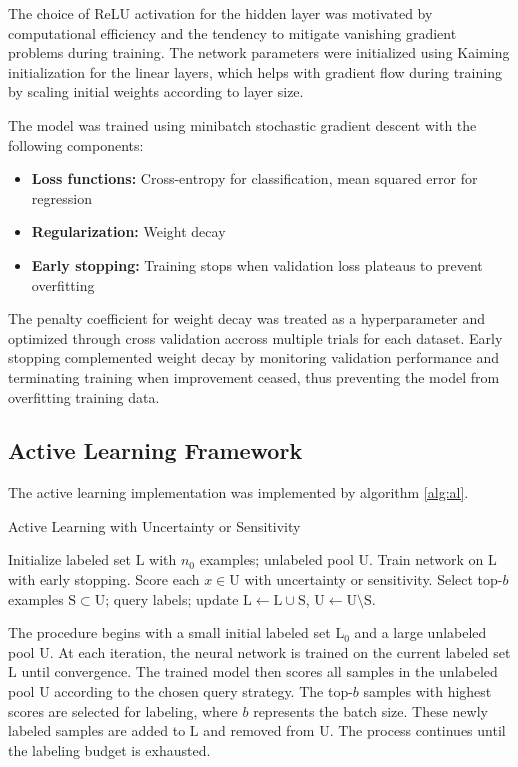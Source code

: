 \documentclass[conference]{IEEEtran}
\newcommand{\set}[1]{\mathrm{#1}}  %
\begin{document}
The choice of ReLU activation for the hidden layer was motivated by computational efficiency and the tendency to mitigate vanishing gradient problems during training. The network parameters were initialized using Kaiming initialization for the linear layers, which helps with gradient flow during training by scaling initial weights according to layer size.

The model was trained using minibatch stochastic gradient descent with the following components:

\begin{itemize}
\item \textbf{Loss functions:} Cross-entropy for classification, mean squared error for regression
\item \textbf{Regularization:} Weight decay
\item \textbf{Early stopping:} Training stops when validation loss plateaus to prevent overfitting
\end{itemize}

The penalty coefficient for weight decay was treated as a hyperparameter and optimized through cross validation accross multiple trials for each dataset. Early stopping complemented weight decay by monitoring validation performance and terminating training when improvement ceased, thus preventing the model from overfitting training data.

\subsection{Active Learning Framework}

The active learning implementation was implemented by algorithm \ref{alg:al}.

\begin{algorithm}[t]
\caption{Active Learning with Uncertainty or Sensitivity}
\label{alg:al}
\begin{algorithmic}[1]
\State Initialize labeled set $\set{L}$ with $n_0$ examples; unlabeled pool $\set{U}$.
  \State Train network on $\set{L}$ with early stopping.
  \State Score each $x\in \set{U}$ with uncertainty or sensitivity.
  \State Select top-$b$ examples $\set{S}\subset \set{U}$; query labels; update $\set{L}\leftarrow \set{L}\cup \set{S}$, $\set{U}\leftarrow \set{U}\setminus \set{S}$.
\EndWhile
\end{algorithmic}
\end{algorithm}

The procedure begins with a small initial labeled set $\set{L}_0$ and a large unlabeled pool $\set{U}$. At each iteration, the neural network is trained on the current labeled set $\set{L}$ until convergence. The trained model then scores all samples in the unlabeled pool $\set{U}$ according to the chosen query strategy. The top-$b$ samples with highest scores are selected for labeling, where $b$ represents the batch size. These newly labeled samples are added to $\set{L}$ and removed from $\set{U}$. The process continues until the labeling budget is exhausted.
\end{document}
